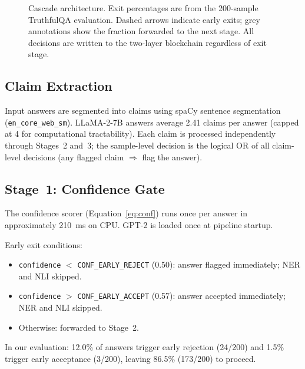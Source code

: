\documentclass[11pt,a4paper]{article}
\begin{document}
\begin{figure}[htb]
\caption{Cascade architecture. Exit percentages are from the 200-sample
TruthfulQA evaluation. Dashed arrows indicate early exits; grey annotations
show the fraction forwarded to the next stage. All decisions are written to the
two-layer blockchain regardless of exit stage.}
\label{fig:cascade}
\end{figure}

\subsection{Claim Extraction}

Input answers are segmented into claims using spaCy sentence segmentation
(\texttt{en\_core\_web\_sm}). LLaMA-2-7B answers average 2.41 claims per answer
(capped at 4 for computational tractability). Each claim is processed
independently through Stages~2 and~3; the sample-level decision is the logical
OR of all claim-level decisions (any flagged claim $\Rightarrow$ flag the
answer).

\subsection{Stage~1: Confidence Gate}

The confidence scorer (Equation~\ref{eq:conf}) runs once per answer in
approximately 210~ms on CPU. GPT-2 is loaded once at pipeline startup.

Early exit conditions:
\begin{itemize}
\item \texttt{confidence} $<$ \texttt{CONF\_EARLY\_REJECT} (0.50): answer
      flagged immediately; NER and NLI skipped.
\item \texttt{confidence} $>$ \texttt{CONF\_EARLY\_ACCEPT} (0.57): answer
      accepted immediately; NER and NLI skipped.
\item Otherwise: forwarded to Stage~2.
\end{itemize}

In our evaluation: 12.0\% of answers trigger early rejection (24/200) and 1.5\%
trigger early acceptance (3/200), leaving 86.5\% (173/200) to proceed.
\end{document}
